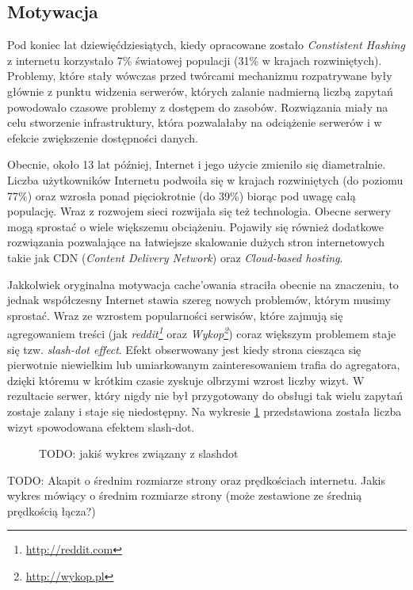 \documentclass[a4paper,11pt]{scrartcl}
\newcommand{\s}{ }
\newcommand{\keszowania}{cache'owania}
\begin{document}
\subsection{Motywacja}
Pod koniec lat dziewięćdziesiątych, kiedy opracowane zostało \textit{Constistent Hashing} z internetu korzystało 7\% światowej populacji (31\% w krajach rozwiniętych). Problemy, które stały wówczas przed twórcami mechanizmu rozpatrywane były głównie z punktu widzenia serwerów, których zalanie nadmierną liczbą zapytań powodowało czasowe problemy z dostępem do zasobów. Rozwiązania miały na celu stworzenie infrastruktury, która pozwalałaby na odciążenie serwerów i w efekcie zwiększenie dostępności danych.

Obecnie, około 13 lat później, Internet i jego użycie zmieniło się diametralnie. Liczba użytkowników Internetu podwoiła się w krajach rozwiniętych (do poziomu 77\%) oraz wzrosła ponad pięciokrotnie (do 39\%) biorąc pod uwagę całą populację. Wraz z rozwojem sieci rozwijała się też technologia. Obecne serwery mogą sprostać o wiele większemu obciążeniu. Pojawiły się również dodatkowe rozwiązania pozwalające na łatwiejsze skalowanie dużych stron internetowych takie jak CDN (\textit{Content Delivery Network}) oraz \textit{Cloud-based hosting}.

Jakkolwiek oryginalna motywacja \keszowania\s straciła obecnie na znaczeniu, to jednak współczesny Internet stawia szereg nowych problemów, którym musimy sprostać. Wraz ze wzrostem popularności serwisów, które zajmują się agregowaniem treści (jak \textit{reddit\footnote{\url{http://reddit.com}}} oraz \textit{Wykop\footnote{\url{http://wykop.pl}}}) coraz większym problemem staje się tzw. \textit{slash-dot effect}. Efekt obserwowany jest kiedy strona ciesząca się pierwotnie niewielkim lub umiarkowanym zainteresowaniem trafia do agregatora, dzięki któremu w krótkim czasie zyskuje olbrzymi wzrost liczby wizyt. W rezultacie serwer, który nigdy nie był przygotowany do obsługi tak wielu zapytań zostaje zalany i staje się niedostępny. Na wykresie \ref{fig_slashdot} przedstawiona została liczba wizyt spowodowana efektem slash-dot.

\begin{figure}
\label{fig_slashdot}
\caption{TODO: jakiś wykres związany z slashdot}
\end{figure}


TODO: Akapit o średnim rozmiarze strony oraz prędkościach internetu. Jakis wykres mówiący o średnim rozmiarze strony (może zestawione ze średnią prędkością łącza?)
\end{document}
